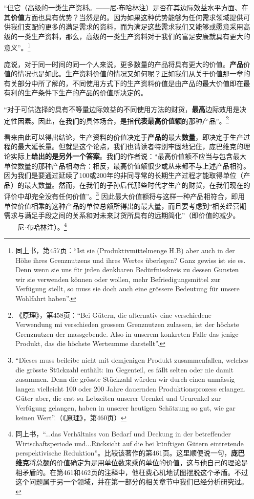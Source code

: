 \documentclass[fontset=fandol, a4paper, 12pt, openright]{ctexbook}
\begin{document}
“但它（高级的一类生产资料。——尼$\cdot$布哈林注）是否在其边际效益水平方面、在其\textbf{价值}方面也具有优势？当然是的。因为如果这种优势能够为任何需求领域提供可供我们支配的更多的满足需求的资料，而为满足这些需求我们又能够或愿意采用高级的一类生产资料，那么，高级的一类生产资料对于我们的富足安康就具有更大的意义”。\footnote{同上书，第457页：“Ist sie (Produktivmittelmenge H.B) aber auch in der H\"{o}he ihres Grenznutzens und ihres Wertes \"{u}berlegen? Ganz gewiss ist sie es. Denn wenn sie uns f\"{u}r jrden denkbaren Bed\"{u}rfnisskreis zu dessen Gunsten wir sie verwenden k\"{o}nnen oder wollen, mehr Befriedigungsmittel zur Verf\"{u}gung stellt, so muss sie doch auch eine gr\"{o}ssere Bedeutung f\"{u}r unsere Wohlfahrt haben”.}

庞说，对于同一时间的同一个人来说，更多数量的产品将具有更大的价值。\textbf{产品}价值的情况也是如此。生产资料价值的情况又如何呢？正如我们从关于价值那一章的有关部分中所了解的，不同使用方式下的生产资料价值是由产品的最大价值即在最有利的生产条件下生产的产品的价值所决定的。

“对于可供选择的具有不等量边际效益的不同使用方法的财货，\textbf{最高}边际效用是决定性因素。因此，在我们的具体场合，是指\textbf{代表最高价值额}的那种产品”。\footnote{《原理》，第458页：“Bei G\"{u}tern, die alternativ eine verschiedene Verwendung mi verschieden grossem Grenznutzen zulassen, ist der h\"{o}chste Grenznutzen der massgebende. Also in unserem konkreten Falle das jenige Produkt, das die h\"{o}chste Wertsumme darstellt”.}

看来由此可以得出结论，生产资料的价值决定于\textbf{产品的}最大\textbf{数量}，即决定于生产过程的最大延长量。但就是这个论点，我们也请读者特别牢固地记住，庞巴维克的理论实际上\textbf{给出的是另外一个答案}。我们的作者说：“最高价值额不应当与包含最大单位数量的那种产品相吻合：相反，最高价值额很少或从来都不与上述产品相符。因为我们是要通过延续了100或200年的非同寻常的长期生产过程才能取得单位（产品）的最大数量。然而，在我们的子孙后代那些时代才生产的财货，在我们现在的评价中却完全没有任何价值”。\footnote{“Dieses muss beileibe nicht mit demjenigen Produkt zusammenfallen, welches die gr\"{o}sste St\"{u}ckzahl enth\"{a}lt: im Gegenteil, es f\"{a}llt selten oder nie damit zusammen. Denn die gr\"{o}sste St\"{u}ckzahl w\"{u}rden wir durch einen unm\"{a}ssig langen vielleicht 100 oder 200 Jahre dauernden Produktionsprozess erlangen. G\"{u}ter aber, die erst su Lebzeiten unserer Urenkel und Ururenkel zur Verf\"{u}gung gelangen, haben in unserer heutigen Sch\"{a}tzung so gut, wie gar keinen Wert”.（《原理》，第460页）} 因此最大价值额将与这样一种产品相符合，即用单位价值相乘的这种产品的单位总额所得出的最大量，而且要考虑到“相关经营期需求与满足手段之间的关系和对未来财货所具有的远期简化”（即价值的减少。——尼$\cdot$布哈林注）。\footnote{同上书，“...das Verh\"{a}ltniss von Bedarf und Deckung in der betreffender Wirtschaftsperiode und...R\"{u}cksicht auf die bei k\"{u}nftigen G\"{u}tern eintretende perspektivische Reduktion”。比较该著作的第461页。这里顺便说一句，\textbf{庞巴维克}将总额的价值确定为是用单位数来乘的单位的价值，这与他自己的理论是相矛盾的。在第461和462页的注释中，他枉费心机地试图摆脱这个矛盾。不过这个问题属于另一个领域，并在第一部分的相关章节中我们已经分析研究过。}
\end{document}
